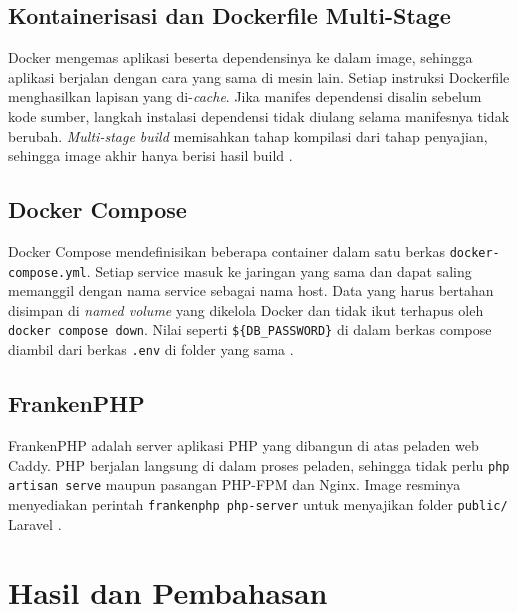 \documentclass[a4paper,oneside,12pt]{report}
\newcommand{\tocboldsection}[1]{%
  \protect\renewcommand{\protect\cftchapfont}{\protect\bfseries}%
  #1%
  \protect\renewcommand{\protect\cftchapfont}{}%
}
\begin{document}
\section{Kontainerisasi dan Dockerfile Multi-Stage}
Docker mengemas aplikasi beserta dependensinya ke dalam image, sehingga aplikasi berjalan dengan cara yang sama di mesin lain. Setiap instruksi Dockerfile menghasilkan lapisan yang di-\textit{cache}. Jika manifes dependensi disalin sebelum kode sumber, langkah instalasi dependensi tidak diulang selama manifesnya tidak berubah. \textit{Multi-stage build} memisahkan tahap kompilasi dari tahap penyajian, sehingga image akhir hanya berisi hasil build \cite{docker-multistage,nginx}.

\section{Docker Compose}
Docker Compose mendefinisikan beberapa container dalam satu berkas \texttt{docker-compose.yml}. Setiap service masuk ke jaringan yang sama dan dapat saling memanggil dengan nama service sebagai nama host. Data yang harus bertahan disimpan di \textit{named volume} yang dikelola Docker dan tidak ikut terhapus oleh \texttt{docker compose down}. Nilai seperti \texttt{\$\{DB\_PASSWORD\}} di dalam berkas compose diambil dari berkas \texttt{.env} di folder yang sama \cite{docker-compose}.

\section{FrankenPHP}
FrankenPHP adalah server aplikasi PHP yang dibangun di atas peladen web Caddy. PHP berjalan langsung di dalam proses peladen, sehingga tidak perlu \texttt{php artisan serve} maupun pasangan PHP-FPM dan Nginx. Image resminya menyediakan perintah \texttt{frankenphp php-server} untuk menyajikan folder \texttt{public/} Laravel \cite{frankenphp}.

\clearpage

\chapter[\texorpdfstring{\tocboldsection{Hasil dan Pembahasan}}{Hasil dan Pembahasan}]{Hasil dan Pembahasan}
\end{document}
